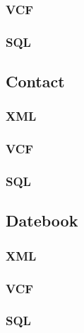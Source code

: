 \subsubsection{VCF}


\subsubsection{SQL}


\subsection{Contact}
\subsubsection{XML}
\subsubsection{VCF}
\subsubsection{SQL}


\subsection{Datebook}
\subsubsection{XML}
\subsubsection{VCF}
\subsubsection{SQL}

